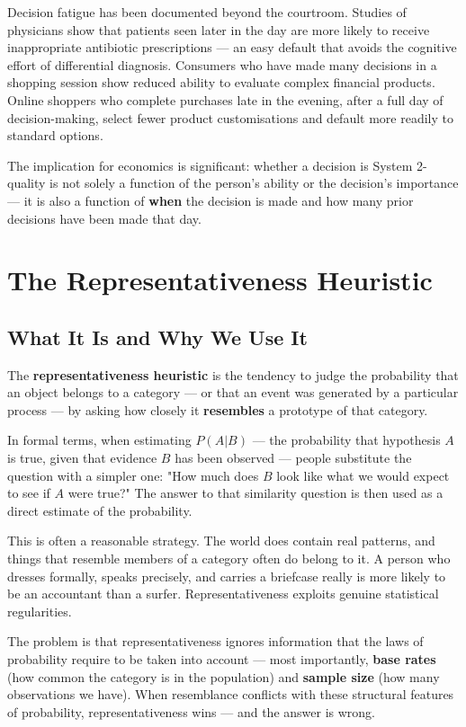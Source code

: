 \documentclass[12pt, letterpaper]{article}
\begin{document}
Decision fatigue has been documented beyond the courtroom. Studies of physicians show that patients seen later in the day are more likely to receive inappropriate antibiotic prescriptions --- an easy default that avoids the cognitive effort of differential diagnosis. Consumers who have made many decisions in a shopping session show reduced ability to evaluate complex financial products. Online shoppers who complete purchases late in the evening, after a full day of decision-making, select fewer product customisations and default more readily to standard options.

The implication for economics is significant: whether a decision is System 2-quality is not solely a function of the person's ability or the decision's importance --- it is also a function of \textbf{when} the decision is made and how many prior decisions have been made that day.




\section{The Representativeness Heuristic}



\subsection{What It Is and Why We Use It}


The \textbf{representativeness heuristic} is the tendency to judge the probability that an object belongs to a category --- or that an event was generated by a particular process --- by asking how closely it \textbf{resembles} a prototype of that category.

In formal terms, when estimating $P(A|B)$ --- the probability that hypothesis $A$ is true, given that evidence $B$ has been observed --- people substitute the question with a simpler one: "How much does $B$ look like what we would expect to see if $A$ were true?" The answer to that similarity question is then used as a direct estimate of the probability.

This is often a reasonable strategy. The world does contain real patterns, and things that resemble members of a category often do belong to it. A person who dresses formally, speaks precisely, and carries a briefcase really is more likely to be an accountant than a surfer. Representativeness exploits genuine statistical regularities.

The problem is that representativeness ignores information that the laws of probability require to be taken into account --- most importantly, \textbf{base rates} (how common the category is in the population) and \textbf{sample size} (how many observations we have). When resemblance conflicts with these structural features of probability, representativeness wins --- and the answer is wrong.
\end{document}
